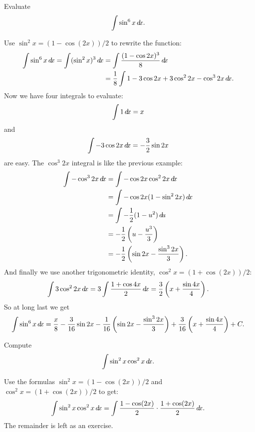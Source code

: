 \documentclass{ximera}
\begin{document}
\begin{example}
Evaluate 
\[
\int \sin^6 x\mathop{}\!d\! x.
\]
\begin{explanation}
Use $\sin^2x =(1-\cos(2x))/2$ to rewrite the function:
\begin{align*}
  \int \sin^6 x\d x=\int (\sin^2 x)^3\d x&=
  \int {(1-\cos 2x)^3\over 8}\d x \\
  &={1\over 8}\int 1-3\cos 2x+3\cos^2 2x-\cos^3 2x\d x.
\end{align*}
Now we have four integrals to evaluate:
\[
\int 1\mathop{}\!d\! x=x
\]
and
\[
\int -3\cos 2x\mathop{}\!d\! x = -{3\over 2}\sin 2x
\]
are easy. The $\cos^3 2x$ integral is like the previous example:
\begin{align*}
  \int -\cos^3 2x\d x&=\int -\cos 2x\cos^2 2x\d x \\
  &=\int -\cos 2x(1-\sin^2 2x)\d x \\
  &=\int -{1\over 2}(1-u^2)\d u \\
  &=-{1\over 2}\left(u-{u^3\over 3}\right) \\
  &=-{1\over 2}\left(\sin 2x-{\sin^3 2x\over 3}\right).
\end{align*}
And finally we use another trigonometric identity,
$\cos^2x=(1+\cos(2x))/2$:
\[
  \int 3\cos^2 2x\mathop{}\!d\! x=3\int {1+\cos 4x\over 2}\mathop{}\!d\! x=
  {3\over 2}\left(x+{\sin 4x\over 4}\right).
\]
So at long last we get
\[
  \int \sin^6 x\mathop{}\!d\! x = {x\over8} -{3\over 16}\sin 2x 
  -{1\over 16}\left(\sin 2x-{\sin^3 2x\over 3}\right)
  +{3\over 16}\left(x+{\sin 4x\over 4}\right)+C.
\]
\end{explanation}
\end{example}


\begin{example}
Compute 
\[
\int \sin^2x\cos^2x\mathop{}\!d\! x.
\]
\begin{explanation} 
Use the formulas
$\sin^2x =(1-\cos(2x))/2$ and $\cos^2x =(1+\cos(2x))/2$ to get:
\[
  \int \sin^2x\cos^2x\mathop{}\!d\! x=\int {1-\cos(2x)\over2}\cdot
  {1+\cos(2x)\over2}\mathop{}\!d\! x.
\]
The remainder is left as an exercise.
\end{explanation}
\end{example}
\end{document}
